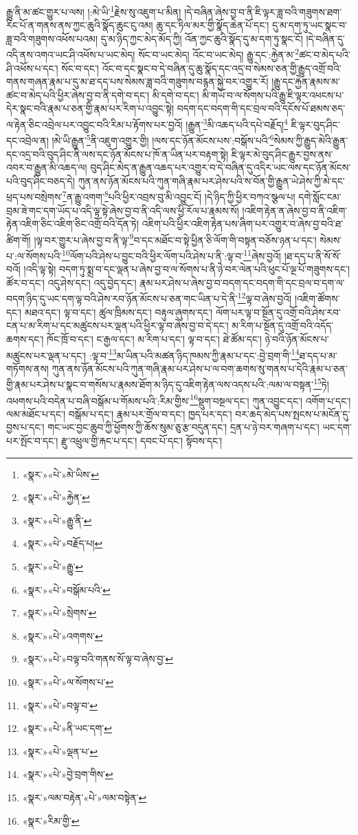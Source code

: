 རྒྱུ་ནི་མ་ཚང་གྱུར་པ་ལས། །:མེ་ཡི་\footnote{«སྣར་»«པེ་»མེ་ཡིས་}རྗེས་སུ་འཇུག་པ་མིན། །དེ་བཞིན་ཞེས་བྱ་བ་ནི་ཇི་ལྟར་ཟླ་བའི་གཟུགས་ཐག་རིང་པོ་ན་གནས་ནས་ཀྱང་ཆུའི་སྣོད་ཆུང་ངུ་འམ། ཆུ་དང་ཏིལ་མར་གྱི་སྣོད་ཆེན་པོ་དང་། དུ་མ་དག་ཏུ་ཡང་སྣང་བ་ཟླ་བའི་གཟུགས་འཕོས་པའམ། དུ་མ་ཉིད་ཀྱང་མེད་མོད་ཀྱི། འོན་ཀྱང་ཆུའི་སྣོད་དུ་མ་དག་ཏུ་སྣང་ངོ། །དེ་བཞིན་དུ་འདི་ནས་འགའ་ཡང་ཤི་འཕོས་པ་ཡང་མེད། སོང་བ་ཡང་མེད། འོང་བ་ཡང་མེད། རྒྱུ་དང་:རྐྱེན་མ་\footnote{«སྣར་»«པེ་»རྐྱེན་}ཚང་བ་མེད་པའི་ཤི་འཕོས་པ་དང་། སོང་བ་དང་། འོང་བ་དང་སྣང་བ་དེ་བཞིན་དུ་ཆུ་སྣོད་དང་འདྲ་བ་སེམས་ཅན་གྱི་རྒྱུད་འགྲོ་བའི་གནས་གཞན་རྣམ་པ་དུ་མ་ཐ་དད་པས་སེམས་ཟླ་བའི་གཟུགས་བརྙན་སྐྱེ་བར་འགྱུར་རོ། །རྒྱུ་དང་རྐྱེན་རྣམས་མ་ཚང་བ་མེད་པའི་ཕྱིར་ཞེས་བྱ་བ་ནི་དགེ་བ་དང་། མི་དགེ་བ་དང་། མི་གཡོ་བ་ལ་སོགས་པའི་རྒྱུ་ཇི་ལྟར་འཕངས་པ་དེར་སྣང་བའི་རྣམ་པ་ཅན་གྱི་རྣམ་པར་རིག་པ་འབྱུང་སྟེ། བདག་དང་བདག་གི་དང་བྲལ་བའི་དངོས་པོ་ཐམས་ཅད་ལ་རྟེན་ཅིང་འབྲེལ་པར་འབྱུང་བའི་རིམ་པ་རྟོགས་པར་བྱའོ། །རྒྱུན་\footnote{«སྣར་»«པེ་»རྒྱུ་ནི་}མི་འཆད་པའི་དཔེ་བརྗོད།\footnote{«སྣར་»«པེ་»བརྗོད་པ།} ཇི་ལྟར་བུད་ཤིང་དང་འབྲེལ་ན། །མེ་ཡི་རྒྱུན་\footnote{«སྣར་»«པེ་»རྒྱུ་}ནི་འཇུག་འགྱུར་གྱི། །ལས་དང་ཉོན་མོངས་པས་:བསྒོས་པའི་\footnote{«སྣར་»«པེ་»བསྒོམ་པའི་}སེམས་ཀྱི་རྒྱུད་མེའི་རྒྱུན་དང་འདྲ་བའི་བུད་ཤིང་ནི་ལས་དང་ཉོན་མོངས་པ་ཁོ་ན་ཡིན་པར་བརྟག་སྟེ། ཇི་ལྟར་མེ་བུད་ཤིང་རྒྱུར་བྱས་ནས་འབར་བ་རྒྱུན་མི་འཆད་ལ། བུད་ཤིང་མེད་ན་རྒྱུན་འཆད་པར་འགྱུར་བ་དེ་བཞིན་དུ་འདིར་ཡང་ལས་དང་ཉོན་མོངས་པའི་བུད་ཤིང་བཅད་དེ། ཀུན་ནས་ཉོན་མོངས་པའི་ཀུན་གཞི་རྣམ་པར་ཤེས་པའི་ས་བོན་གྱི་རྒྱུན་ཡེ་ཤེས་ཀྱི་མེ་དང་ཕྲད་པས་བསྲེགས་\footnote{«སྣར་»«པེ་»སྲེགས་}ན་རྒྱུ་འགག་\footnote{«སྣར་»«པེ་»འགགས་}པའི་ཕྱིར་འབྲས་བུ་མི་འབྱུང་ངོ། །དེ་ཉིད་ཀྱི་ཕྱིར་བཀའ་སྩལ་པ། དགེ་སློང་ངམ་བྲམ་ཟེ་གང་དག་ཡོད་པ་འདི་ལྟ་སྟེ་ཞེས་བྱ་བ་ནི་འདི་ལས་ཕྱི་རོལ་པ་རྣམས་སོ། །འཇིག་རྟེན་ན་ཞེས་བྱ་བ་ནི་འཇིག་རྟེན་འཇིག་ཅིང་འཇིག་ཅིང་འགྲོ་བའི་དོན་ཏེ། འཇིག་པའི་ཕྱིར་འཇིག་རྟེན་པས་ཞིག་པར་འགྱུར་བ་ཞེས་བྱ་བའི་ཐ་ཚིག་གོ། །ལྟ་བར་གྱུར་པ་ཞེས་བྱ་བ་ནི་ལྟ་\footnote{«སྣར་»«པེ་»བལྟ་བའི་གནས་སོ་ལྟ་བ་ཞེས་བྱ་}བ་དང་མཐོང་བ་སྟེ་ཕྱིན་ཅི་ལོག་གི་བསྟན་བཅོས་ཉན་པ་དང་། སེམས་པ་:ལ་སོགས་པའི་\footnote{«སྣར་»«པེ་»ལ་སོགས་པ་}ལོག་པའི་ཤེས་པ་བྱུང་བའི་ཕྱིར་ལོག་པའི་ཤེས་པ་ནི་:ལྟ་བ་\footnote{«སྣར་»«པེ་»བལྟ་བ་}ཞེས་བྱའོ། །ཐ་དད་པ་ནི་སོ་སོ་བའོ། །འདི་ལྟ་སྟེ། བདག་ཏུ་སྨྲ་བ་དང་ལྡན་པ་ཞེས་བྱ་བ་ལ་སོགས་པ་ནི་ཉེ་བར་ལེན་པའི་ཕུང་པོ་ལྔ་པོ་གཟུགས་དང་། ཚོར་བ་དང་། འདུ་ཤེས་དང་། འདུ་བྱེད་དང་། རྣམ་པར་ཤེས་པ་ཞེས་བྱ་བ་བདག་དང་བདག་གི་དང་བྲལ་བ་དག་ལ་བདག་ཉིད་དུ་ཡང་དག་ལྟ་བའི་ཤེས་རབ་ཉོན་མོངས་པ་ཅན་གང་ཡིན་པ་དེ་ནི་\footnote{«སྣར་»«པེ་»ནི་ཡང་དག་}ལྟ་བ་ཞེས་བྱའོ། །འཇིག་ཚོགས་དང་། མཐའ་དང་། ལྟ་བ་དང་། ཚུལ་ཁྲིམས་དང་། བརྟུལ་ཞུགས་དང་། ལོག་པར་ལྟ་བ་སྔོན་དུ་འགྲོ་བའི་ཤེས་རབ་ངན་པ་མ་རིག་པ་དང་མཚུངས་པར་ལྡན་པའི་ཕྱིར་ལྟ་བ་ཞེས་བྱ་བ་དེ་དང་། མ་རིག་པ་སྔོན་དུ་འགྲོ་བའི་འདོད་ཆགས་དང་། ཁོང་ཁྲོ་བ་དང་། ང་རྒྱལ་དང་། མ་རིག་པ་དང་། ལྟ་བ་དང་། ཐེ་ཚོམ་དང་། ཉེ་བའི་ཉོན་མོངས་པ་མཚུངས་པར་ལྡན་པ་དང་། :ལྟ་བ་\footnote{«སྣར་»«པེ་»ལྡན་པ་}མ་ཡིན་པའི་མཚན་ཉིད་ཁམས་ཀྱི་རྣམ་པ་དང་:བྱེ་བྲག་གི་\footnote{«སྣར་»«པེ་»བྱེ་བྲག་གིས་}ཐ་དད་པ་མ་གཏོགས་ནས། ཀུན་ནས་ཉོན་མོངས་པའི་ཀུན་གཞི་རྣམ་པར་ཤེས་པ་ལ་བག་ཆགས་སུ་གནས་པ་དེའི་རྣམ་པ་ཅན་གྱི་རྣམ་པར་ཤེས་པ་སྣང་བ་གསོས་པ་རྣམས་ཐོག་མ་ཉིད་དུ་འཇིག་རྟེན་ལས་འདས་པའི་:ལམ་ལ་བསྟན་\footnote{«སྣར་»ལམ་བརྟེན་«པེ་»ལམ་བསྟེན་}ཏེ། འཕགས་པའི་བདེན་པ་བཞི་བསྒོམ་པ་གོམས་པའི་:རིམ་གྱིས་\footnote{«སྣར་»རིམ་གྱི་}སྡུག་བསྔལ་དང་། ཀུན་འབྱུང་དང་། འགོག་པ་དང་། ལམ་མཐོང་པ་དང་། བསྒོམ་པ་དང་། རྣམ་པར་གྲོལ་བ་དང་། ཁྱད་པར་དང་། བར་ཆད་མེད་པས་སྤངས་པ་མངོན་དུ་བྱས་པ་དང་། གང་ཡང་བྱང་ཆུབ་ཀྱི་ཕྱོགས་ཀྱི་ཆོས་སུམ་ཅུ་རྩ་བདུན་དང་། དྲན་པ་ཉེ་བར་གཞག་པ་དང་། ཡང་དག་པར་སྤོང་བ་དང་། རྫུ་འཕྲུལ་གྱི་རྐང་པ་དང་། དབང་པོ་དང་། སྟོབས་དང་། 